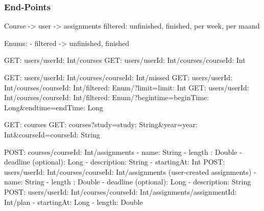 \subsubsection{End-Points}

Course -> user -> assignments
  filtered: unfinished, finished, per week, per maand

Enums:
- filtered -> unfinished, finished

GET: users/{userId: Int}/courses
GET: users/{userId: Int}/courses/{courseId: Int}

GET: users/{userId: Int}/courses/{courseId: Int}/missed
GET: users/{userId: Int}/courses/{courseId: Int}/{filtered: Enum}/?limit={limit: Int}
GET: users/{userId: Int}/courses/{courseId: Int}/{filtered: Enum}/?begintime={beginTime: Long}&endtime={endTime: Long}

GET: courses
GET: courses?study={study: String}&year={year: Int}&courseId={courseId: String}

POST: courses/{courseId: Int}/assignments
  - name: String
  - length : Double
  - deadline (optional): Long
  - description: String
  - startingAt: Int
POST: users/{userId: Int}/courses/{courseId: Int}/assignments (user-created assignments)
  - name: String
  - length : Double
  - deadline (optional): Long
  - description: String
POST: users/{userId: Int}/courses/{courseId: Int}/assignments/{assignmentId: Int}/plan
  - startingAt: Long
  - length: Double
